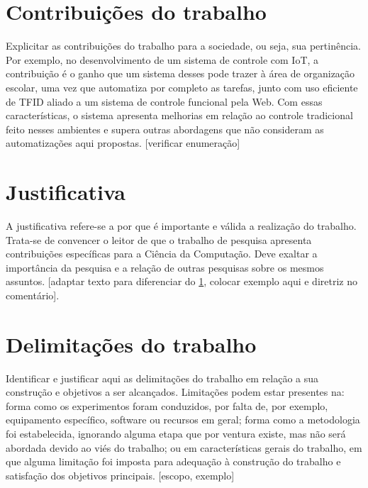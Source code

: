 \section{Contribuições do trabalho}\label{sec:CONTRIBUICOES}
Explicitar as contribuições do trabalho para a sociedade, ou seja, sua pertinência. Por exemplo, no desenvolvimento de um sistema de controle com IoT, a contribuição é o ganho que um sistema desses pode trazer à área de organização escolar, uma vez que automatiza por completo as tarefas, junto com uso eficiente de TFID aliado a um sistema de controle funcional pela Web. Com essas características, o sistema apresenta melhorias em relação ao controle tradicional feito nesses ambientes e supera outras abordagens que não consideram as automatizações aqui propostas. [verificar enumeração]


\section{Justificativa}\label{sec:JUSTIFICATIVA}
A justificativa refere-se a por que é importante e válida a realização do trabalho. Trata-se de convencer o leitor de que o trabalho de pesquisa  apresenta contribuições específicas para a Ciência da Computação. Deve exaltar a importância da pesquisa e a relação de outras pesquisas sobre os mesmos assuntos. [adaptar texto para diferenciar do \ref{sec:CONTRIBUICOES}, colocar exemplo aqui e diretriz no comentário].


\section{Delimitações do trabalho}\label{sec:DELIMITACOES}
Identificar e justificar aqui as delimitações do trabalho em relação a sua construção e objetivos a ser alcançados. Limitações podem estar presentes na: forma como os experimentos foram conduzidos, por falta de, por exemplo, equipamento específico, software ou recursos em geral; forma como a metodologia foi estabelecida, ignorando alguma etapa que por ventura existe, mas não será abordada devido ao viés do trabalho; ou em características gerais do trabalho, em que alguma limitação foi imposta para adequação à construção do trabalho e satisfação dos objetivos principais. [escopo, exemplo]
